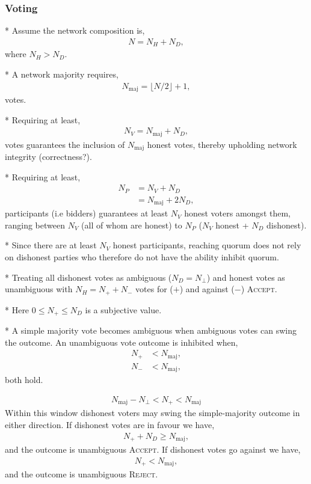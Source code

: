 \subsubsection{Voting}

* Assume the network composition is,
\begin{align}
	N=N_H+N_D,
\end{align}
where $N_H>N_D$.

* A network majority requires,
\begin{align}
	N_\mathrm{maj} = \lfloor N/2\rfloor+1,
\end{align}
votes.

* Requiring at least,
\begin{align}
	N_V = N_\mathrm{maj} + N_D,
\end{align}
votes guarantees the inclusion of $N_\mathrm{maj}$ honest votes, thereby upholding network integrity (correctness?). %

* Requiring at least,
\begin{align}
	N_P & = N_V + N_D \nonumber     \\
	    & = N_\mathrm{maj} + 2 N_D,
\end{align}
participants (i.e bidders) guarantees at least $N_V$ honest voters amongst them, ranging between $N_V$ (all of whom are honest) to $N_P$ ($N_V$ honest + $N_D$ dishonest).

* Since there are at least $N_V$ honest participants, reaching quorum does not rely on dishonest parties who therefore do not have the ability inhibit quorum.

* Treating all dishonest votes as ambiguous ($N_D=N_\bot$) and honest votes as unambiguous with $N_H = N_+ + N_-$ votes for ($+$) and against ($-$) \textsc{Accept}.

* Here $0\leq N_+ \leq N_D$ is a subjective value.

* A simple majority vote becomes ambiguous when ambiguous votes can swing the outcome. An unambiguous vote outcome is inhibited when,
\begin{align}
	N_+ &< N_\mathrm{maj},\nonumber\\
	N_- &< N_\mathrm{maj},
\end{align}
both hold.

\begin{align}
	N_\mathrm{maj} - N_\bot < N_+ < N_\mathrm{maj}
\end{align}
Within this window dishonest voters may swing the simple-majority outcome in either direction.
If dishonest votes are in favour we have,
\begin{align}
	N_+ + N_D \geq N_\mathrm{maj},
\end{align}
and the outcome is unambiguous \textsc{Accept}.
If dishonest votes go against we have,
\begin{align}
	N_+ < N_\mathrm{maj},
\end{align}
and the outcome is unambiguous \textsc{Reject}.

